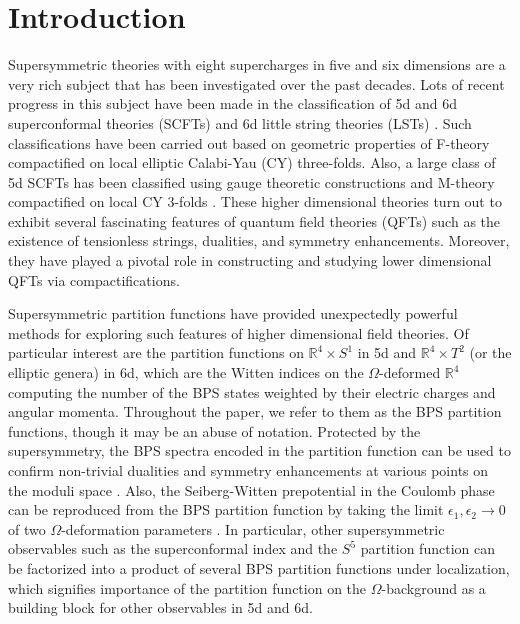 \section{Introduction}\label{sec:intro}

Supersymmetric theories with eight supercharges in five and six dimensions are a very rich subject that has been investigated over the past decades. Lots of recent progress in this subject have been made in the classification of 5d and 6d superconformal theories (SCFTs) \cite{Heckman:2013pva, Heckman:2015bfa, Bhardwaj:2015xxa} and 6d little string theories (LSTs) \cite{Bhardwaj:2015oru}. Such classifications have been carried out based on geometric properties of F-theory compactified on local elliptic Calabi-Yau (CY) three-folds. Also, a large class of 5d SCFTs has been classified using gauge theoretic constructions \cite{Seiberg:1996bd, Intriligator:1997pq, Jefferson:2017ahm} and M-theory compactified on local CY 3-folds \cite{Douglas:1996xp, Intriligator:1997pq, DelZotto:2017pti, Xie:2017pfl, Jefferson:2018irk, Bhardwaj:2018yhy, Bhardwaj:2018vuu, Apruzzi:2018nre,Apruzzi:2019vpe, Apruzzi:2019opn, Bhardwaj:2019fzv, Apruzzi:2019kgb, Apruzzi:2019enx}. These higher dimensional theories turn out to exhibit several fascinating features of quantum field theories (QFTs) such as the existence of tensionless strings, dualities, and symmetry enhancements. Moreover, they have played a pivotal role in constructing and studying lower dimensional QFTs via compactifications.

Supersymmetric partition functions have provided unexpectedly powerful methods for exploring such features of higher dimensional field theories. Of particular interest are the partition functions on $\mathbb{R}^4\times S^1$ in 5d and $\mathbb{R}^4\times T^2$ (or the elliptic genera) in 6d, which are the Witten indices on the $\Omega$-deformed $\mathbb{R}^4$ computing the number of the BPS states weighted by their electric charges and angular momenta. Throughout the paper, we refer to them as the BPS partition functions, though it may be an abuse of notation. Protected by the supersymmetry, the BPS spectra encoded in the partition function can be used to confirm non-trivial dualities and symmetry enhancements at various points on the moduli space \cite{Bao:2011rc,Hayashi:2013qwa,Taki:2014pba,Mitev:2014jza,Hayashi:2014wfa,Gaiotto:2015una,Hayashi:2015xla,Hayashi:2016abm,Yun:2016yzw,Hayashi:2017jze,Kim:2018gjo,Chen:2020jla}. Also, the Seiberg-Witten prepotential in the Coulomb phase can be reproduced from the BPS partition function by taking the limit $\epsilon_1,\epsilon_2\rightarrow 0$ of two $\Omega$-deformation parameters \cite{Nekrasov:2002qd,Nekrasov:2003rj}. In particular, other supersymmetric observables such as the superconformal index \cite{Bhattacharya:2008zy,Kim:2012gu,Kim:2013nva,Iqbal:2012xm} and the $S^5$ partition function \cite{Kallen:2012va,Kim:2012ava,Kallen:2012zn,Lockhart:2012vp,Imamura:2013xna,Kim:2012qf} can be factorized into a product of several BPS partition functions under localization, which signifies importance of the partition function on the $\Omega$-background as a building block for other observables in 5d and 6d.

